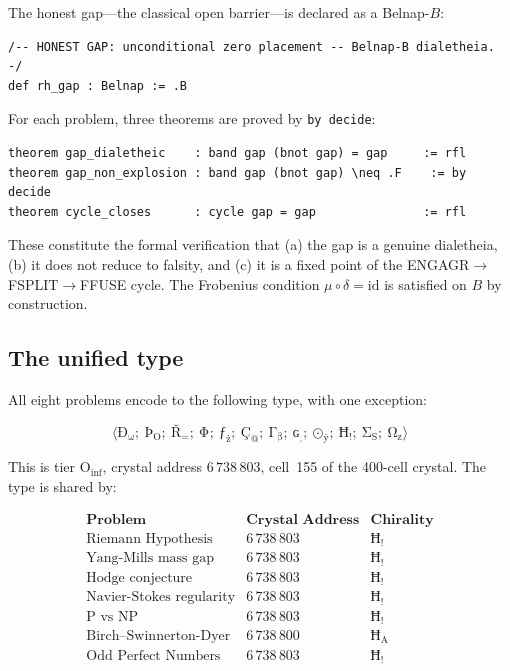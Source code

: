 \documentclass[11pt,a4paper]{article}
\theoremstyle{definition}
\begin{document}
The honest gap---the classical open barrier---is declared as a Belnap-$B$:

\begin{lstlisting}[language=Lean]
/-- HONEST GAP: unconditional zero placement -- Belnap-B dialetheia. -/
def rh_gap : Belnap := .B
\end{lstlisting}

For each problem, three theorems are proved by {\tt by decide}:

\begin{lstlisting}[language=Lean]
theorem gap_dialetheic    : band gap (bnot gap) = gap     := rfl
theorem gap_non_explosion : band gap (bnot gap) \neq .F    := by decide
theorem cycle_closes      : cycle gap = gap               := rfl
\end{lstlisting}

These constitute the formal verification that (a) the gap is a genuine dialetheia,
(b) it does not reduce to falsity, and (c) it is a fixed point of the
ENGAGR$\to$FSPLIT$\to$FFUSE cycle. The Frobenius condition $\mu \circ \delta =
\text{id}$ is satisfied on $B$ by construction.

\subsection{The unified type}

All eight problems encode to the following type, with one exception:

\[
\langle \text{Ð}_{\text{ω}};\ \text{Þ}_{\text{O}};\ \text{Ř}_{\text{=}};\ \text{Φ}_{\text{}};\ \text{ƒ}_{\text{ż}};\ \text{Ç}_{\text{@}};\ \text{Γ}_{\text{β}};\ \text{ɢ}_{\text{ˌ}};\ \text{⊙}_{\text{ÿ}};\ \text{Ħ}_{\text{!}};\ \text{Σ}_{\text{S}};\ \text{Ω}_{\text{z}} \rangle
\]

This is tier $\text{O}_{\text{inf}}$, crystal address $6\,738\,803$, cell~155
of the 400-cell crystal. The type is shared by:

\[
\begin{array}{lcc}
\textbf{Problem} & \textbf{Crystal Address} & \textbf{Chirality} \\ \hline
\text{Riemann Hypothesis}          & 6\,738\,803 & \text{Ħ}_{\text{!}} \\
\text{Yang-Mills mass gap}         & 6\,738\,803 & \text{Ħ}_{\text{!}} \\
\text{Hodge conjecture}            & 6\,738\,803 & \text{Ħ}_{\text{!}} \\
\text{Navier-Stokes regularity}    & 6\,738\,803 & \text{Ħ}_{\text{!}} \\
\text{P vs NP}                     & 6\,738\,803 & \text{Ħ}_{\text{!}} \\
\text{Birch--Swinnerton-Dyer}      & 6\,738\,800 & \text{Ħ}_{\text{A}} \\
\text{Odd Perfect Numbers}         & 6\,738\,803 & \text{Ħ}_{\text{!}}
\end{array}
\]
\end{document}
